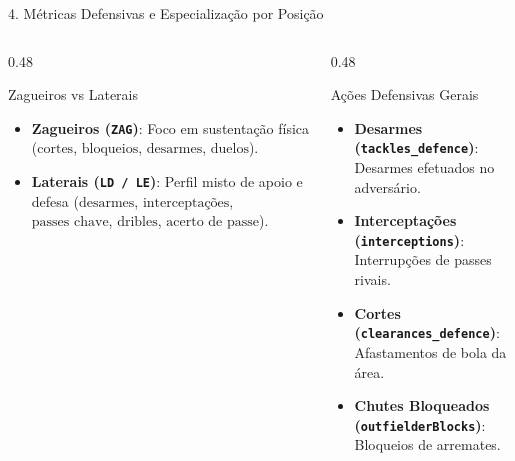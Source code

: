 \documentclass[aspectratio=169, 10pt]{beamer}
\begin{document}
\begin{frame}{4. Métricas Defensivas e Especialização por Posição}
  \begin{columns}
    \begin{column}{0.48\textwidth}
      \begin{block}{Zagueiros vs Laterais}
        \begin{itemize}
          \item \textbf{Zagueiros (\texttt{ZAG})}: Foco em sustentação física ($\text{cortes}$, $\text{bloqueios}$, $\text{desarmes}$, $\text{duelos}$).
          \item \textbf{Laterais (\texttt{LD / LE})}: Perfil misto de apoio e defesa ($\text{desarmes}$, $\text{interceptações}$, $\text{passes chave}$, $\text{dribles}$, $\text{acerto de passe}$).
        \end{itemize}
      \end{block}
    \end{column}
    \begin{column}{0.48\textwidth}
      \begin{block}{Ações Defensivas Gerais}
        \begin{itemize}
          \item \textbf{Desarmes (\texttt{tackles\_defence})}: Desarmes efetuados no adversário.
          \item \textbf{Interceptações (\texttt{interceptions})}: Interrupções de passes rivais.
          \item \textbf{Cortes (\texttt{clearances\_defence})}: Afastamentos de bola da área.
          \item \textbf{Chutes Bloqueados (\texttt{outfielderBlocks})}: Bloqueios de arremates.
        \end{itemize}
      \end{block}
    \end{column}
  \end{columns}
\end{frame}
\end{document}
